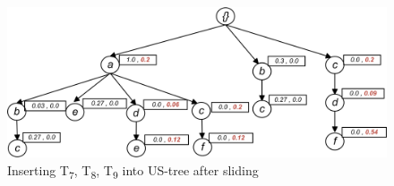 %
%
\begin{figure}
  \centering
	\includegraphics[width=.8\textwidth]{images/sim_789.jpg}  
	\caption{Inserting T\textsubscript{7}, T\textsubscript{8}, T\textsubscript{9} into US-tree after sliding}
	\label{figure:w2}
\end{figure}
%